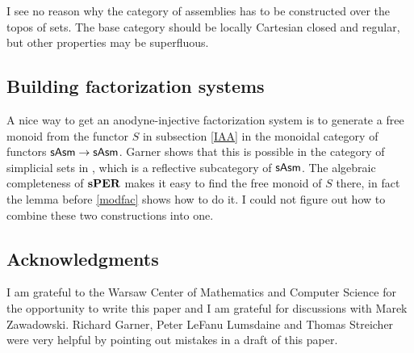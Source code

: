 \documentclass{amsart}
\theoremstyle{plain}
\theoremstyle{definition}
\begin{document}
I see no reason why the category of assemblies has to be constructed over the topos of sets. The base category should be locally Cartesian closed and regular, but other properties may be superfluous.

\subsection{Building factorization systems}
A nice way to get an anodyne-injective factorization system is to generate a free monoid from the functor $S$ in subsection \ref{IAA} in the monoidal category of functors $\mathsf{sAsm} \to\mathsf{sAsm}$.  Garner shows that this is possible in the category of simplicial sets in \cite{MR2899720}, which is a reflective subcategory of $\mathsf{sAsm}$. The algebraic completeness of $\mathbf{s} \mathbf{PER}$ makes it easy to find the free monoid of $S$ there, in fact the lemma before \ref{modfac} shows how to do it. I could not figure out how to combine these two constructions into one.

\subsection*{Acknowledgments} 
I am grateful to the Warsaw Center of Mathematics and Computer Science for the opportunity to write this paper and I am grateful for discussions with Marek Zawadowski. Richard Garner, Peter LeFanu Lumsdaine and Thomas Streicher were very helpful by pointing out mistakes in a draft of this paper.



{}
\end{document}
